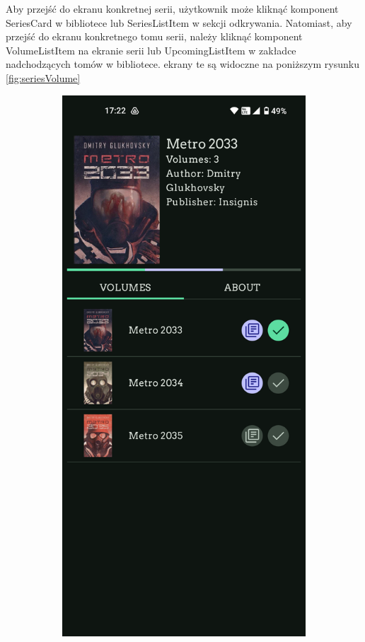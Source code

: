 \documentclass[12pt,twoside]{article}
\begin{document}
\FloatBarrier
Aby przejść do ekranu konkretnej serii, użytkownik może kliknąć komponent SeriesCard w bibliotece lub 
SeriesListItem w sekcji odkrywania. Natomiast, aby przejść do ekranu konkretnego tomu serii, należy kliknąć 
komponent VolumeListItem na ekranie serii lub UpcomingListItem w zakładce nadchodzących tomów w bibliotece. 
ekrany te są widoczne na poniższym rysunku \ref{fig:seriesVolume}
\begin{figure}[ht]
    \centering
    \begin{subfigure}[b]{0.48\textwidth}
        \includegraphics[width=\textwidth]{figures/series.png}

\end{subfigure}
\end{figure}
\end{document}

